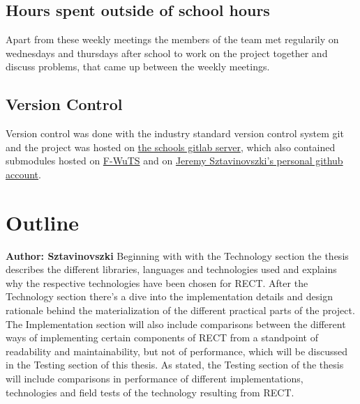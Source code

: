 \subsection{Hours spent outside of school hours} 
Apart from these weekly meetings the members of the team met regularily on wednesdays and thursdays after school to work on the project together and discuss problems, that came up between the weekly meetings.

\subsection{Version Control}
Version control was done with the industry standard version control system git and the project was hosted on \href{https://gitlab.htlwrn.ac.at/Sztavinovszki.Jeremy/RECT}{the schools gitlab server}, 
which also contained submodules hosted on \href{https://github.com/F-WuTS/}{F-WuTS} and on \href{https://github.com/if-loop69420}{Jeremy Sztavinovszki's personal github account}.

\section{Outline}
\textbf{Author: Sztavinovszki}
Beginning with with the Technology section the thesis describes the different libraries, languages and technologies used and explains why the respective technologies have been chosen for RECT.
After the Technology section there's a dive into the implementation details and design rationale behind the materialization of the different practical parts of the project.
The Implementation section will also include comparisons between the different ways of implementing certain components of RECT from a standpoint of readability and maintainability, but not of performance,
which will be discussed in the Testing section of this thesis. As stated, the Testing section of the thesis will include comparisons in performance of different implementations,
technologies and field tests of the technology resulting from RECT.



